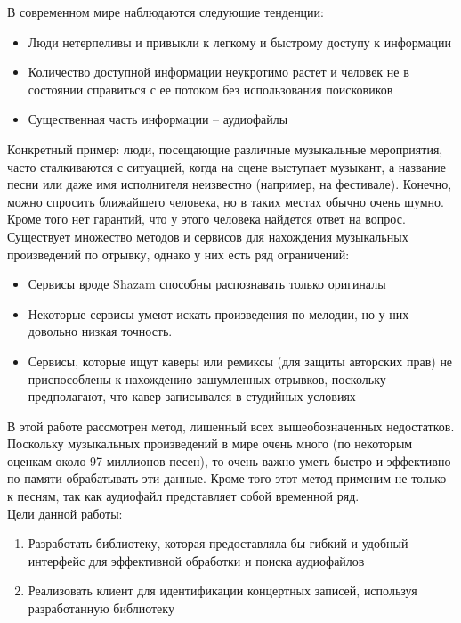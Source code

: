 \Introduction

В современном мире наблюдаются следующие тенденции:
\begin{itemize}
    \item Люди нетерпеливы и привыкли к легкому и быстрому доступу к информации
    \item Количество доступной информации неукротимо растет и человек не в состоянии
    справиться с ее потоком без использования поисковиков
    \item Существенная часть информации -- аудиофайлы
\end{itemize}

Конкретный пример: люди, посещающие различные музыкальные мероприятия, часто сталкиваются
с ситуацией, когда на сцене выступает музыкант, а название песни
или даже имя исполнителя неизвестно (например, на фестивале).
Конечно, можно спросить ближайшего человека, но в таких местах обычно очень шумно.
Кроме того нет гарантий, что у этого человека найдется ответ на вопрос.
Существует множество методов и сервисов для нахождения музыкальных произведений по отрывку,
однако у них есть ряд ограничений:
\begin{itemize}
    \item Сервисы вроде Shazam способны распознавать только оригиналы
    \item Некоторые сервисы умеют искать произведения по мелодии, но у них
            довольно низкая точность.
    \item Сервисы, которые ищут каверы или ремиксы (для защиты авторских прав) не приспособлены
            к нахождению зашумленных отрывков, поскольку предполагают, что кавер записывался в
            студийных условиях
\end{itemize}
В этой работе рассмотрен метод, лишенный всех вышеобозначенных недостатков.
Поскольку музыкальных произведений в мире очень много (по некоторым оценкам около 97 миллионов песен),
то очень важно уметь быстро и эффективно по памяти обрабатывать эти данные.
Кроме того этот метод применим не только к песням, так как аудиофайл представляет собой временной ряд.\\
Цели данной работы:
\begin{enumerate}[label=\arabic*.]
    \item Разработать библиотеку, которая предоставляла бы гибкий и удобный интерфейс
            для эффективной обработки и поиска аудиофайлов
    \item Реализовать клиент для идентификации концертных записей, используя разработанную
    библиотеку
\end{enumerate}
